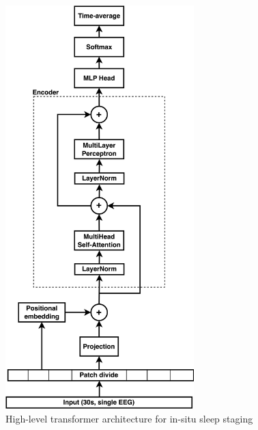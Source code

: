 \begin{figure}
    \centering
    \caption{High-level transformer architecture for in-situ sleep staging}
    \includegraphics[width=0.65\textwidth]{assets/vit.png}
\end{figure}
\label{fig:vit}

